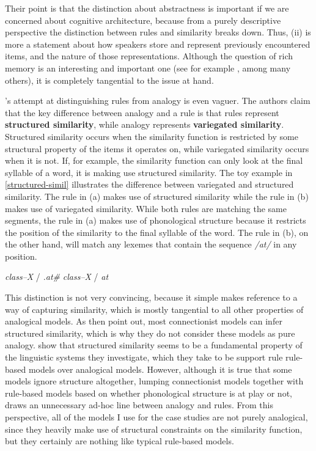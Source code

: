 Their point is that the distinction about abstractness is important if we are concerned about cognitive architecture, because from a purely descriptive perspective the distinction between rules and similarity breaks down. Thus, (ii) is more a statement about how speakers store and represent previously encountered items, and the nature of those representations. Although the question of rich memory is an interesting and important one (see for example \cites{Bybee.2010, Kapatsinski.2014a, Port.2010, Port.2010a}, among many others), it is completely tangential to the issue at hand.

\citet{Albright.2003}'s attempt at distinguishing rules from analogy is even vaguer. The authors claim that the key difference between analogy and a rule is that rules represent \textbf{structured similarity}, while analogy represents \textbf{variegated similarity}. Structured similarity occurs when the similarity function is restricted by some structural property of the items it operates on, while variegated similarity occurs when it is not. If, for example, the similarity function can only look at the final syllable of a word, it is making use structured similarity. The toy example in \ref{structured-simil} illustrates the difference between variegated and structured similarity. The rule in (a) makes use of structured similarity while the rule in (b) makes use of variegated similarity. While both rules are matching the same segments, the rule in (a) makes use of phonological structure because it restricts the position of the similarity to the final syllable of the word. The rule in (b), on the other hand, will match any lexemes that contain the sequence \textit{/at/} in any position.

\begin{exe}
    \ex \label{structured-simil}
    \begin{xlist}
        \ex \textit{class--X} / \textit{.at\#}
        \ex \textit{class--X} / \textit{at}
    \end{xlist}
\end{exe}

This distinction is not very convincing, because it simple makes reference to a way of capturing similarity, which is mostly tangential to all other properties of analogical models. As \textcite[p. 5]{Albright.2003} then point out, most connectionist models can infer structured similarity, which is why they do not consider these models as pure analogy. \textcite{Albright.2003} show that structured similarity seems to be a fundamental property of the linguistic systems they investigate, which they take to be support rule rule-based models over analogical models. However, although it is true that some models ignore structure altogether, lumping connectionist models together with rule-based models based on whether phonological structure is at play or not, draws an unnecessary ad-hoc line  between analogy and rules. From this perspective, all of the models I use for the case studies are not purely analogical, since they heavily make use of structural constraints on the similarity function, but they certainly are nothing like typical rule-based models.

